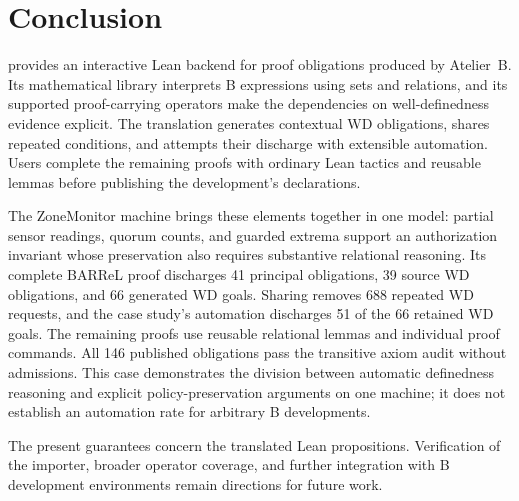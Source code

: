 \section{Conclusion}
\label{sec:conclusion}

\barrel provides an interactive Lean backend for proof obligations
produced by Atelier~B. Its mathematical library interprets B expressions
using sets and relations, and its supported proof-carrying operators
make the dependencies on well-definedness evidence explicit. The
translation generates contextual WD obligations, shares repeated
conditions, and attempts their discharge with extensible automation.
Users complete the remaining proofs with ordinary Lean tactics and
reusable lemmas before publishing the development's declarations.

The ZoneMonitor machine brings these elements together in one
model: partial sensor readings, quorum counts, and guarded extrema
support an authorization invariant whose preservation also requires
substantive relational reasoning. Its complete BARReL proof discharges
41 principal obligations, 39 source WD obligations, and
66 generated WD goals. Sharing removes 688 repeated WD requests, and
the case study's automation discharges 51 of the 66 retained WD goals.
The remaining proofs use reusable relational lemmas and individual
proof commands. All 146 published obligations pass the transitive
axiom audit without admissions. This case demonstrates the division
between automatic definedness reasoning and explicit policy-preservation
arguments on one machine; it does not establish an automation rate for
arbitrary B developments.

The present guarantees concern the translated Lean propositions.
Verification of the importer, broader operator coverage, and further
integration with B development environments remain directions for
future work.
